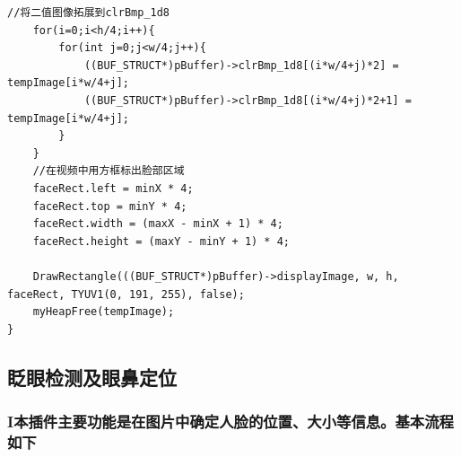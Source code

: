 \documentclass[12pt,hyperref,a4paper,UTF8]{ctexart}
\begin{document}
\begin{lstlisting}[caption={人脸识别插件主函数}, label={lst:example}]
	//将二值图像拓展到clrBmp_1d8
	for(i=0;i<h/4;i++){
		for(int j=0;j<w/4;j++){
			((BUF_STRUCT*)pBuffer)->clrBmp_1d8[(i*w/4+j)*2] = tempImage[i*w/4+j];
			((BUF_STRUCT*)pBuffer)->clrBmp_1d8[(i*w/4+j)*2+1] = tempImage[i*w/4+j];
		}
	}
    //在视频中用方框标出脸部区域
	faceRect.left = minX * 4;
	faceRect.top = minY * 4;
	faceRect.width = (maxX - minX + 1) * 4;
	faceRect.height = (maxY - minY + 1) * 4;

	DrawRectangle(((BUF_STRUCT*)pBuffer)->displayImage, w, h, faceRect, TYUV1(0, 191, 255), false);
	myHeapFree(tempImage);
}
        \end{lstlisting}

    \subsection{眨眼检测及眼鼻定位}
        \subsubsection*{\textrm{I}本插件主要功能是在图片中确定人脸的位置、大小等信息。基本流程如下}
 
\end{document}
